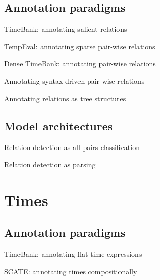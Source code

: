 \documentclass[12pt,compress]{beamer}
\begin{document}
\subsection{Annotation paradigms}


\begin{frame}{TimeBank: annotating salient relations}
\end{frame}


\begin{frame}{TempEval: annotating sparse pair-wise relations}
\end{frame}


\begin{frame}{Dense TimeBank: annotating pair-wise relations}
\end{frame}


\begin{frame}{Annotating syntax-driven pair-wise relations}
\end{frame}


\begin{frame}{Annotating relations as tree structures}
\end{frame}


\subsection{Model architectures}


\begin{frame}{Relation detection as all-pairs classification}
\end{frame}


\begin{frame}{Relation detection as parsing}
\end{frame}


\section{Times}


\subsection{Annotation paradigms}


\begin{frame}{TimeBank: annotating flat time expressions}
\end{frame}


\begin{frame}{SCATE: annotating times compositionally}
\end{frame}
\end{document}
